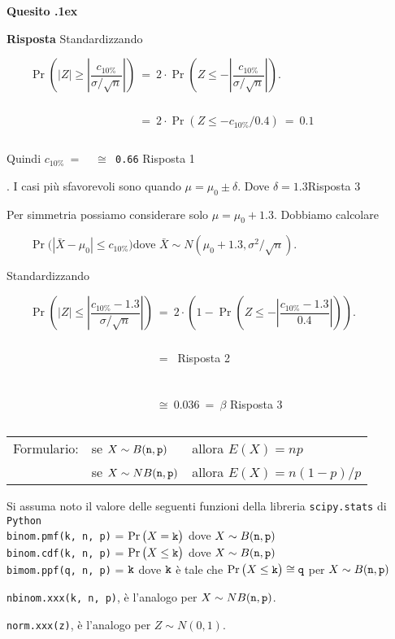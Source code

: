 \documentclass[11pt,twoside,a4paper]{article}
\newcounter{quesito}
\newenvironment{question}{\addtocounter{quesito}{1}\par\textbf{Quesito \thequesito.\kern1ex}}{\vspace{0.5\parskip}}
\newenvironment{answer}{\par\textbf{Risposta\quad}}{\vspace{\parskip}}
\begin{document}
\begin{question}
\begin{answer}
Standardizzando

$\qquad\Pr\left(|Z|\ge \left|\dfrac{c_{10\%}}{\sigma/\sqrt{n}}\right|\right)
\ =\ 
2\cdot\Pr\left(Z\le -\left|\dfrac{c_{10\%}}{\sigma/\sqrt{n}}\right|\right)$.

$\qquad\phantom{\Pr\left(|Z|\ge \left|\dfrac{c_{10\%}}{\sigma/\sqrt{n}}\right|\right)}
\ =\ 
2 \cdot \Pr\left(Z\le-c_{10\%}/0.4\right)
\ =\ 
0.1$

Quindi 
$c_{10\%}
\ =\ $
{\tt\color{blue}{- 0.4 * norm.ppf(0.05)} $\cong$ 0.66}\hfill{\color{blue} Risposta 1}

\bigskip
2. I casi più sfavorevoli sono quando $\mu=\mu_0\pm\delta$. Dove {\color{blue}$\delta = 1.3$\hfill Risposta 3}

Per simmetria possiamo considerare solo $\mu=\mu_0+1.3$. Dobbiamo calcolare

$\qquad\Pr\big(|\bar X-\mu_0|\le c_{10\%}\big)$\hfil dove $\bar X\sim N(\mu_0+1.3, \sigma^2/\sqrt{n})$.

Standardizzando

$\qquad\Pr\left(|Z|\le \left|\dfrac{c_{10\%}-1.3}{\sigma/\sqrt{n}}\right|\right)
\ =\ 
2\cdot\left(1 - \Pr\left(Z\le -\left|\dfrac{c_{10\%}-1.3}{0.4}\right|\right)\right)$.


$\qquad\phantom{\Pr\left(|Z|\le \left|\dfrac{c_{10\%}-1.3}{\sigma/\sqrt{n}}\right|\right)}
\ =\ $
{\tt{}}\hfill{\color{blue} Risposta 2}


$\qquad\phantom{\Pr\left(|Z|\le \left|\dfrac{c_{10\%}-1.3}{\sigma/\sqrt{n}}\right|\right)}
\ \cong\  
0.036
\ =\ 
\beta$\hfill{\color{blue} Risposta 3}

\end{answer}
\end{question}


\vfill\hrulefill\par
\begin{tabular}{@{}lll}
Formulario:& se $X\sim B({\tt n},{\tt p})$ & allora $E(X)=np$\\
           & se $X\sim NB({\tt n},{\tt p})$& allora $E(X)=n(1-p)/p$
\end{tabular}

Si assuma noto il valore delle seguenti funzioni della libreria {\tt scipy.stats\/} di  {\tt Python\/}\\
{\tt binom.pmf(k, n, p)} = $\Pr\big(X={\tt k}\big)$ dove $X\sim B({\tt n},{\tt p})$\\
{\tt binom.cdf(k, n, p)} = $\Pr\big(X\le{\tt k}\big)$ dove  $X\sim B({\tt n},{\tt p})$ \\
{\tt bimom.ppf(q, n, p)} = ${\tt k}$ dove ${\tt k}$ è tale che $\Pr\big(X\le{\tt k}\big)\cong{\tt q}$ per $X\sim B({\tt n},{\tt p})$ 

{\tt nbinom.xxx(k, n, p)}, è l'analogo per $X\sim NB({\tt n},{\tt p})$.

{\tt norm.xxx(z)}, è l'analogo per $Z\sim N(0,1)$.
\end{document}

